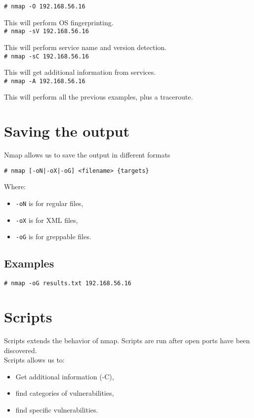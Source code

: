 \documentclass[twocolumn]{article}
\begin{document}
\texttt{\# nmap -O 192.168.56.16}

This will perform OS fingerprinting.\\

\texttt{\# nmap -sV 192.168.56.16}

This will perform service name and version detection.\\

\texttt{\# nmap -sC 192.168.56.16}

This will get additional information from services.\\

\texttt{\# nmap -A 192.168.56.16}

This will perform all the previous examples, plus a traceroute.

\section{Saving the output}

Nmap allows us to save the output in different formats

\texttt{\# nmap [-oN|-oX|-oG] <filename> \{targets\}}

Where:

\begin{itemize}
    \item \texttt{-oN} is for regular files,
    \item \texttt{-oX} is for XML files,
    \item \texttt{-oG} is for greppable files.
\end{itemize}

\subsection{Examples}

\texttt{\# nmap -oG results.txt 192.168.56.16}

\section{Scripts}

Scripts extends the behavior of nmap. Scripts are run after open ports have been discovered.\\

Scripts allows us to:

\begin{itemize}
    \item Get additional information (-C),
    \item find categories of vulnerabilities,
    \item find specific vulnerabilities.
\end{itemize}
\end{document}
